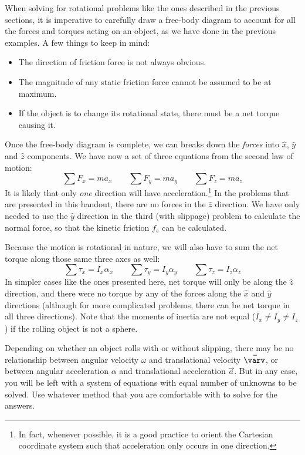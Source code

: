 \documentclass{../../oss-handout}
\newcommand{\xx}{\hat x}
\newcommand{\yy}{\hat y}
\newcommand{\zz}{\hat z}
\begin{document}
When solving for rotational problems like the ones described in the previous
sections, it is imperative to carefully draw a free-body diagram to account for
all the forces and torques acting on an object, as we have done in the previous
examples. A few things to keep in mind:
\begin{itemize}[nosep]
\item The direction of friction force is not always obvious.
\item The magnitude of any static friction force cannot be assumed to be at
  maximum.
\item If the object is to change its rotational state, there must be a net
  torque causing it.
\end{itemize}
Once the free-body diagram is
complete, we can breaks down the \emph{forces} into $\xx$, $\yy$ and $\zz$
components. We have now a set of three equations from the second law of motion:
\begin{equation*}
  \sum F_x=ma_x\quad\quad \sum F_y=ma_y\quad\quad \sum F_z=ma_z
\end{equation*}
It is likely that only \emph{one} direction will have acceleration.\footnote{In
  fact, whenever possible, it is a good practice to orient the Cartesian
  coordinate system such that acceleration only occurs in one direction.} In
the problems that are presented in this handout, there are no forces in the
$\zz$ direction. We have only needed to use the $\yy$ direction in the third
(with slippage) problem to calculate the normal force, so that the kinetic
friction $f_s$ can be calculated.

Because the motion is rotational in nature, we will also have to sum the net
torque along those same three axes as well:
\begin{equation*}
  \sum\tau_x=I_x\alpha_x\quad\quad \sum\tau_y=I_y\alpha_y\quad\quad 
  \sum\tau_z=I_z\alpha_z
\end{equation*}
In simpler cases like the ones presented here, net torque will only be along
the $\zz$ direction, and there were no torque by any of the forces along the
$\xx$ and $\yy$ directions (although for more complicated problems, there can
be net torque in all three directions). Note that the moments of inertia are
not equal ($I_x\neq I_y\neq I_z$) if the rolling object is not a sphere.

Depending on whether an object rolls with or without slipping, there may be
no relationship between angular velocity $\omega$ and translational velocity
$\vec\varv$, or between angular acceleration $\alpha$ and translational
acceleration $\vec a$. But in any case, you will be left with a system of
equations with equal number of unknowns to be solved. Use whatever method that
you are comfortable with to solve for the answers.
\end{document}
